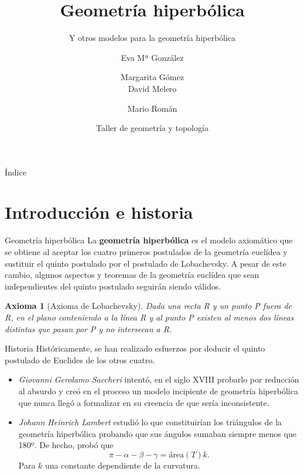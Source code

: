\documentclass[compress]{beamer}
\title{Geometría hiperbólica}                                               %
\subtitle{Y otros modelos para la geometría hiperbólica}                                  %
\author[UGR]{ %
Eva Mª González \and Margarita Gómez  \\ David Melero \and Mario Román \texorpdfstring{\\
\href{}{}}{}} %
\date{Taller de geometría y topología}                                                            %
\newtheorem*{axiom}{Axioma}
\begin{document}
\begin{frame}
\titlepage
\end{frame}

\begin{frame}{Índice}
  \hypertarget{index}{}
  \tableofcontents
\end{frame}

\section{Introducción e historia}
\begin{frame}{Geometría hiperbólica}
  La \textbf{geometría hiperbólica} es el modelo axiomático que se
  obtiene al aceptar los cuatro primeros postulados de la geometría
  euclídea y sustituir el quinto postulado por el postulado de
  Lobachevsky. A pesar de este cambio, algunos aspectos y teoremas
  de la geometría euclídea que sean independientes del quinto postulado
  seguirán siendo válidos.
  
  \pause
  
  \begin{axiom}[Axioma de Lobachevsky]
    Dada una recta R y un punto P fuera de R, en el plano conteniendo a
    la línea R y al punto P existen al menos dos líneas distintas que pasan
    por P y no intersecan a R.
  \end{axiom}
\end{frame}

\begin{frame}{Historia}
  Históricamente, se han realizado esfuerzos por deducir el quinto
  postulado de Euclides de los otros cuatro.

  \begin{itemize}
  \item\textit{Giovanni Gerolamo Saccheri} intentó, en el siglo XVIII
    probarlo por reducción al absurdo y creó en el proceso un modelo
    incipiente de geometría hiperbólica que nunca llegó a formalizar
    en su creencia de que sería inconsistente.
  \item\textit{Johann Heinrich Lambert} estudió lo que constituirían
    los triángulos de la geometría hiperbólica probando que sus
    ángulos sumaban siempre menos que 180º. De hecho, probó que
    \[
      \pi - \alpha- \beta - \gamma = \mathrm{área}(T)k.
    \]
    Para $k$ una constante dependiente de la curvatura.
  \end{itemize}
\end{frame}
\end{document}
